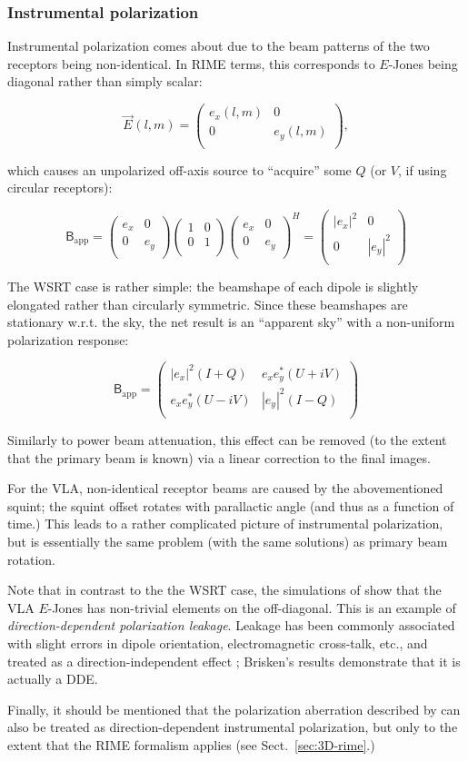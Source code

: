 \documentclass[]{aa}
\newcommand{\matrixtt}[4]{\left( \begin{array}{cc}#1&#2\\#3&#4\\\end{array} \right)}
\newcommand{\herm}{H}
\newcommand{\jones}[2]{\vec {#1}_{#2}}
\newcommand{\coh}[2]{\mathsf{{#1}}_{{#2}}}
\begin{document}
\subsubsection{Instrumental polarization}

Instrumental polarization comes about due to the beam patterns of the two receptors being non-identical. In RIME terms, this corresponds to $E$-Jones being diagonal rather than simply scalar:

\[
\jones{E}{}(l,m) = \matrixtt{e_x(l,m)}{0}{0}{e_y(l,m)},
\]

which causes an unpolarized off-axis source to ``acquire'' some $Q$ (or $V$, if using circular receptors):

\[
\coh{B}{\mathrm{app}} = \matrixtt{e_x}{0}{0}{e_y} 
\matrixtt{1}{0}{0}{1}
\matrixtt{e_x}{0}{0}{e_y}^\herm =
\matrixtt{|e_x|^2}{0}{0}{|e_y|^2}
\]

The WSRT case is rather simple: the beamshape of each dipole is slightly elongated rather than circularly symmetric. Since these beamshapes are stationary w.r.t. the sky, the net result is an ``apparent sky'' with a non-uniform polarization response: 

\[
\coh{B}{\mathrm{app}} = \matrixtt{|e_x|^2(I+Q)}{e_x e^*_y(U+iV)}{e_x e^*_y(U-iV)}{|e_y|^2(I-Q)}
\]

Similarly to power beam attenuation, this effect can be removed (to the extent that the primary beam is known) via a linear correction to the final images.

For the VLA, non-identical receptor beams are caused by the abovementioned squint; the squint offset rotates with parallactic angle (and thus as a function of time.) This leads to a rather complicated picture of instrumental polarization, but is essentially the same problem (with the same solutions) as primary beam rotation.

Note that in contrast to the the WSRT case, the simulations of \citet{Brisken:VLA-beam} show that the VLA $E$-Jones has non-trivial elements on the off-diagonal. This is an example of \emph{direction-dependent polarization leakage}. Leakage has been commonly associated with slight errors in dipole orientation, electromagnetic cross-talk, etc., and treated as a direction-independent effect \citep{ME1,JEN:note185}; Brisken's results demonstrate that it is actually a DDE.

Finally, it should be mentioned that the polarization aberration described by \citet{Carozzi:ME3D} can also be treated as direction-dependent instrumental polarization, but only to the extent that the RIME formalism applies (see Sect.~\ref{sec:3D-rime}.) 
\end{document}
